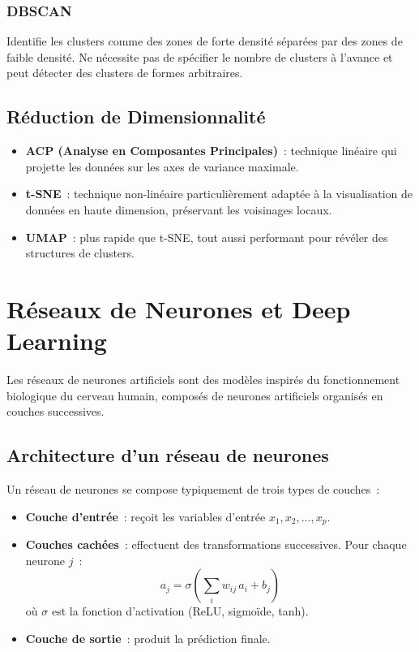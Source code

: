 \subsubsection{DBSCAN}
Identifie les clusters comme des zones de forte densité séparées par des zones de faible densité. Ne nécessite pas de spécifier le nombre de clusters à l'avance et peut détecter des clusters de formes arbitraires.

\subsection{Réduction de Dimensionnalité}

\begin{itemize}[leftmargin=1.5cm, itemsep=4pt]
  \item \textbf{ACP (Analyse en Composantes Principales)}~: technique linéaire qui projette les données sur les axes de variance maximale.
  \item \textbf{t-SNE}~: technique non-linéaire particulièrement adaptée à la visualisation de données en haute dimension, préservant les voisinages locaux.
  \item \textbf{UMAP}~: plus rapide que t-SNE, tout aussi performant pour révéler des structures de clusters.
\end{itemize}

\section{Réseaux de Neurones et Deep Learning}

Les réseaux de neurones artificiels sont des modèles inspirés du fonctionnement biologique du cerveau humain, composés de neurones artificiels organisés en couches successives.

\subsection{Architecture d'un réseau de neurones}

Un réseau de neurones se compose typiquement de trois types de couches~:
\begin{itemize}[leftmargin=1.5cm]
  \item \textbf{Couche d'entrée}~: reçoit les variables d'entrée $x_1, x_2, \ldots, x_p$.
  \item \textbf{Couches cachées}~: effectuent des transformations successives. Pour chaque neurone $j$~:
  \[a_j = \sigma\!\left(\sum_i w_{ij}\,a_i + b_j\right)\]
  où $\sigma$ est la fonction d'activation (ReLU, sigmoïde, tanh).
  \item \textbf{Couche de sortie}~: produit la prédiction finale.
\end{itemize}

